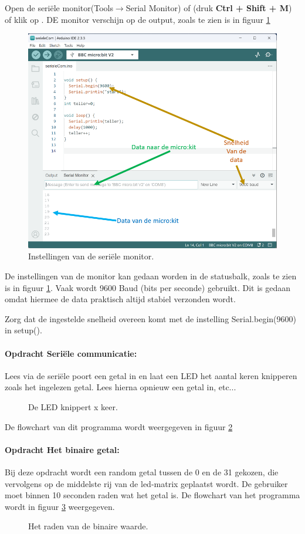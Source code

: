 Open de seriële monitor(Tools$\rightarrow$Serial Monitor) of (druk \colorbox{mygray}{\textbf{Ctrl + Shift + M}}) of klik op . DE monitor verschijn op de output, zoals te zien is in figuur \ref{fig:arser}
\begin{figure}[H]
	\captionsetup{justification=centering}
	\includegraphics[width=0.5 \linewidth]{figuren/serial}
	\centering
	\caption{Instellingen van de seriële monitor.}
	\label{fig:arser}
\end{figure}
De instellingen van de monitor kan gedaan worden in de statusbalk, zoals te zien is in figuur \ref{fig:arser}.
Vaak wordt 9600 Baud (bits per seconde) gebruikt. Dit is gedaan omdat hiermee de data praktisch altijd stabiel verzonden wordt.

Zorg dat de ingestelde snelheid overeen komt met de instelling \textcolor{BurntOrange}{Serial.begin}(9600) in  \textcolor{OliveGreen}{setup}(). 


\paragraph{Opdracht Seriële communicatie:} 
Lees via de seriële poort een getal in en laat een LED het aantal keren knipperen zoals het ingelezen getal. Lees hierna opnieuw een getal in, etc...
\begin{figure}[H]
	\captionsetup{justification=centering}
	\centering
	\eerstefc

	\caption{De LED knippert x keer.}
	\label{fig:flowchart1}
\end{figure}
De flowchart van dit programma wordt weergegeven in figuur \ref{fig:flowchart1}

\paragraph{Opdracht Het binaire getal:} 
Bij deze opdracht wordt een random getal tussen de 0 en de 31 gekozen, die vervolgens op de middelste rij van de led-matrix geplaatst wordt. De gebruiker moet binnen 10 seconden raden wat het getal is. De flowchart van het programma wordt in figuur \ref{fig:flowchart2} weergegeven.
\begin{figure}[H]
	\captionsetup{justification=centering}
	\centering
	\randomfc
	
	\caption{Het raden van de binaire waarde.}
	\label{fig:flowchart2}
\end{figure}

